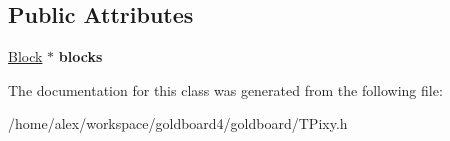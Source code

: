 \subsection*{Public Attributes}
\begin{DoxyCompactItemize}
\item 
\hyperlink{struct_block}{Block} $\ast$ {\bfseries blocks}\hypertarget{class_t_pixy_a3b56576a5135c7209b834b40869eff6a}{}\label{class_t_pixy_a3b56576a5135c7209b834b40869eff6a}

\end{DoxyCompactItemize}


The documentation for this class was generated from the following file\+:\begin{DoxyCompactItemize}
\item 
/home/alex/workspace/goldboard4/goldboard/T\+Pixy.\+h\end{DoxyCompactItemize}
